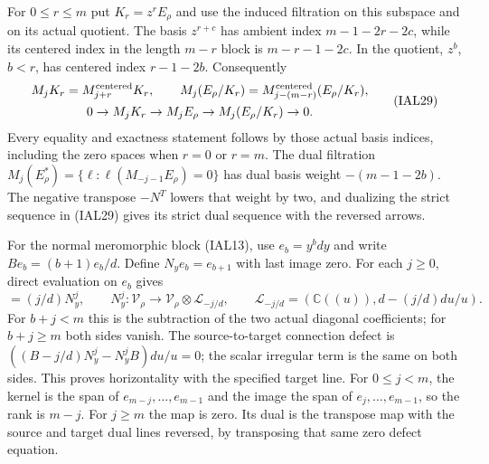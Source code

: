 \documentclass[11pt,a4paper]{article}
\theoremstyle{definition}
\begin{document}
For $0\leq r\leq m$ put $K_r=z^rE_\rho$ and use the induced
filtration on this subspace and on its actual quotient.  The basis
$z^{r+c}$ has ambient index $m-1-2r-2c$, while its centered index in
the length $m-r$ block is $m-r-1-2c$.  In the quotient, $z^b$, $b<r$,
has centered index $r-1-2b$.  Consequently
\begin{equation}
 \begin{gathered}
 M_jK_r=M^{\rm centered}_{j+r}K_r,\qquad
 M_j(E_\rho/K_r)=M^{\rm centered}_{j-(m-r)}(E_\rho/K_r),
 \\
 0\to M_jK_r\to M_jE_\rho\to M_j(E_\rho/K_r)\to0.
 \end{gathered}                                        \tag{IAL29}
\end{equation}
Every equality and exactness statement follows by those actual basis
indices, including the zero spaces when $r=0$ or $r=m$.
The dual filtration $M_j(E_\rho^*)=\{\ell:\ell(M_{-j-1}E_\rho)=0\}$
has dual basis weight $-(m-1-2b)$.  The negative transpose $-N^T$
lowers that weight by two, and dualizing the strict sequence in
(IAL29) gives its strict dual sequence with the reversed arrows.

For the normal meromorphic block (IAL13), use $e_b=y^bdy$ and write
$B e_b=(b+1)e_b/d$.  Define $N_y e_b=e_{b+1}$ with last image zero.
For each $j\geq0$, direct evaluation on $e_b$ gives
\begin{equation}
 [B,N_y^j]=(j/d)N_y^j,\qquad
 N_y^j:\mathcal V_\rho\longrightarrow
 \mathcal V_\rho\otimes\mathcal L_{-j/d},\qquad
 \mathcal L_{-j/d}=(\mathbb C((u)),d-(j/d)du/u).
                                                        \tag{IAL30}
\end{equation}
For $b+j<m$ this is the subtraction of the two actual diagonal
coefficients; for $b+j\geq m$ both sides vanish.  The source-to-target
connection defect is
$((B-j/d)N_y^j-N_y^jB)du/u=0$; the scalar irregular term is the same
on both sides.  This proves horizontality with the specified target
line.  For $0\leq j<m$, the kernel is the span of
$e_{m-j},\ldots,e_{m-1}$ and the image the span of
$e_j,\ldots,e_{m-1}$, so the rank is $m-j$.  For $j\geq m$ the map
is zero.  Its dual is the transpose map with the source and target
dual lines reversed, by transposing that same zero defect equation.
\end{document}
